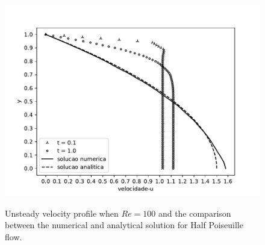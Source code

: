 \begin{figure}[H]
     \centering
     \includegraphics[scale=1]{./02_chaps/cap_validation/figure/half_poiseuille_velocity.pdf}\\
     \medskip
     \caption{
Unsteady velocity profile when $Re=100$ and the comparison between
the numerical and analytical solution for Half Poiseuille flow.} 
     \label{velocidade half poiseuille}
\end{figure}

